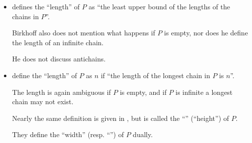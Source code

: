 \begin{remark}
\begin{itemize}
    Gr\"atzer does not mention what happens if \( P \) is empty or if it contains infinite chains.

    He defines the \enquote{width} of \( P \) dually.

    \item \Textcite[2]{Birkhoff1967LatticeTheory} defines the \enquote{length} of \( P \) as \enquote{the least upper bound of the lengths of the chains in \( P \)}.

    Birkhoff also does not mention what happens if \( P \) is empty, nor does he define the length of an infinite chain.

    He does not discuss antichains.

    \item \Textcite[2.37(ii)]{DaveyPriestley2002LatticeTheory} define the \enquote{length} of \( P \) as \( n \) if \enquote{the length of the longest chain in \( P \) is \( n \)}.

    The length is again ambiguous if \( P \) is empty, and if \( P \) is infinite a longest chain may not exist.

    Nearly the same definition is given in \cite[83]{Гуров2013ТеорияРешёток}, but is called the \enquote{} (\enquote{height}) of \( P \).

    They define the \enquote{width} (resp. \enquote{}) of \( P \) dually.
  \end{itemize}
\end{remark}

